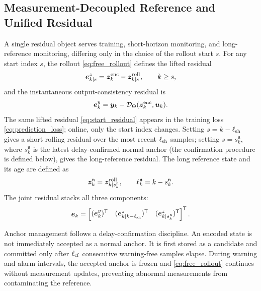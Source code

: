 \documentclass[journal]{IEEEtran}
\newcommand{\T}{\mathsf T}
\newcommand{\1}{\bm 1}
\begin{document}
\subsection{Measurement-Decoupled Reference and Unified Residual}
A single residual object serves training, short-horizon monitoring, and
long-reference monitoring, differing only in the choice of the rollout start
$s$. For any start index $s$, the rollout \eqref{eq:free_rollout} defines the
lifted residual
\begin{equation}
\bm e_{k\mid s}^z=\bm z_k^{\rm enc}-\bm z_{k\mid s}^{\rm roll},
\qquad k\geq s,
\label{eq:start_residual}
\end{equation}
and the instantaneous output-consistency residual is
\begin{equation}
\bm e_k^y=\bm y_k-
\mathcal D_\Theta(\bm z_k^{\rm enc},\bm u_k).
\label{eq:output_residual}
\end{equation}
The same lifted residual \eqref{eq:start_residual} appears in the training
loss \eqref{eq:prediction_loss}; online, only the start index changes. Setting
$s=k-\ell_{\rm sh}$ gives a short rolling residual over the most recent
$\ell_{\rm sh}$ samples; setting $s=s_k^{\mathfrak n}$, where
$s_k^{\mathfrak n}$ is the latest delay-confirmed normal anchor (the
confirmation procedure is defined below), gives the long-reference residual.
The long reference state and its age are defined as
\begin{equation}
\bm z_k^{\mathfrak n}=\bm z_{k\mid s_k^{\mathfrak n}}^{\rm roll},\qquad
\ell_k^{\mathfrak n}=k-s_k^{\mathfrak n}.
\label{eq:normal_reference}
\end{equation}
The joint residual stacks all three components:
\begin{equation}
\bm e_k=
\begin{bmatrix}
(\bm e_k^y)^\T&
(\bm e_{k\mid k-\ell_{\rm sh}}^z)^\T&
(\bm e_{k\mid s_k^{\mathfrak n}}^z)^\T
\end{bmatrix}^{\T}.
\label{eq:joint_residual}
\end{equation}

Anchor management follows a delay-confirmation discipline. An encoded state is
not immediately accepted as a normal anchor. It is first stored as a candidate
and committed only after $\ell_{\rm cf}$ consecutive warning-free samples
elapse. During warning and alarm intervals, the accepted anchor is frozen and
\eqref{eq:free_rollout} continues without measurement updates, preventing
abnormal measurements from contaminating the reference.
\end{document}

